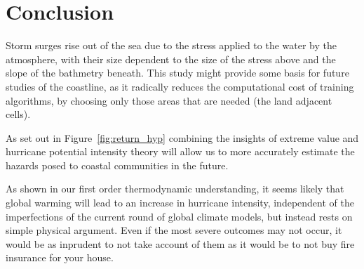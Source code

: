 \section{Conclusion}
\label{sec:8_Conclusion}

Storm surges rise out of the sea due to the stress applied to the water by
the atmosphere, with their size dependent to the size of the stress above and
the slope of the bathmetry beneath. This study might provide some basis for
future studies of the coastline, as it radically reduces the computational cost
of training algorithms, by choosing only those areas that are needed (the
land adjacent cells).

As set out in Figure~\ref{fig:return_hyp} combining the insights of
extreme value and hurricane potential intensity theory will allow
us to more accurately estimate the hazards posed to coastal communities
in the future.

As shown in our first order thermodynamic understanding, it seems likely that
global warming will lead to an increase in hurricane intensity, independent
of the imperfections of the current round of global climate models,
but instead rests on simple physical argument.
Even if the most severe outcomes may not occur,
it would be as inprudent to not take account of them as it would be
to not buy fire insurance for your house.
